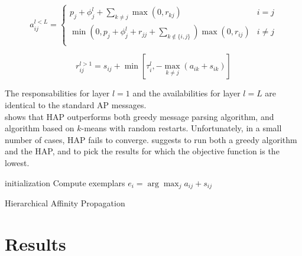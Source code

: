 \documentclass{ipol}
\begin{document}
\begin{equation}
a_{ij}^{l < L} = \begin{cases}
	    p_j + \phi_j^l + \sum_{k \neq j} \max(0, r_{kj}) &  i = j \\
	    \min ( 0, p_j + \phi_j^l + r_{jj} + \sum_{k \notin \{i, j\} } ) \max (0, r_{ij}) & i \neq j\\
	 \end{cases}
\end{equation}

\begin{equation*}
r_{ij}^{l > 1} = s_{ij}  + \min [ \tau_i^l, - \max_{k \neq j} (a_{ik} + s_{ik}) ]
\end{equation*}

The responsabilities for layer $l = 1$ and the availabilities for layer $l =
L$ are identical to the standard AP messages. \\

\cite{hap} shows that HAP outperforms both greedy message parsing algorithm,
and algorithm based on $k$-means with random restarts. Unfortunately, in a
small number of cases, HAP fails to converge. \cite{hap} suggests to run both
a greedy algorithm and the HAP, and to pick the results for which the
objective function is the lowest.

\begin{algorithm}[h]
  \SetLine
  initialization\;
  Compute exemplars $e_i = \arg \max_{j} a_{ij} + s_{ij}$ \;
  \caption{Hierarchical Affinity Propagation}
\end{algorithm}

\section{Results}


\end{document}
